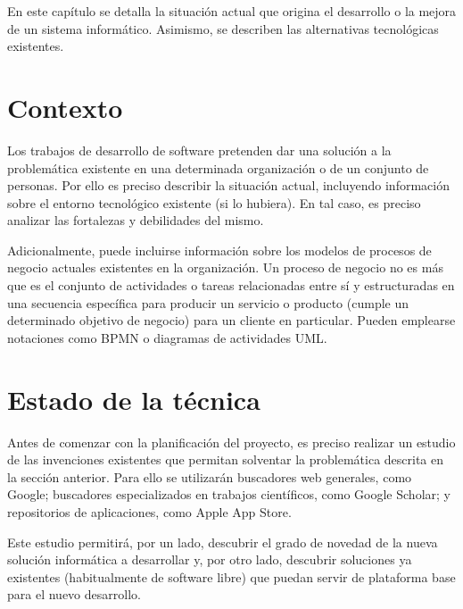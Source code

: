 En este capítulo se detalla la situación actual que origina el desarrollo o la mejora de un sistema informático. Asimismo, se describen las alternativas tecnológicas existentes.

\section{Contexto} 
Los trabajos de desarrollo de software pretenden dar una solución a la problemática existente en una determinada organización o de un conjunto de personas. Por ello es preciso describir la situación actual, incluyendo información sobre el entorno tecnológico existente (si lo hubiera). En tal caso, es preciso analizar las fortalezas y debilidades del mismo.

Adicionalmente, puede incluirse información sobre los modelos de procesos de negocio actuales existentes en la organización. Un proceso de negocio no es más que es el conjunto de actividades o tareas relacionadas entre sí y estructuradas en una secuencia específica para producir un servicio o producto (cumple un determinado objetivo de negocio) para un cliente en particular. Pueden emplearse notaciones como BPMN o diagramas de actividades UML.

\section{Estado de la técnica} 
Antes de comenzar con la planificación del proyecto, es preciso realizar un estudio de las invenciones existentes que permitan solventar la problemática descrita en la sección anterior. Para ello se utilizarán buscadores web generales, como Google; buscadores especializados en trabajos científicos, como Google Scholar; y repositorios de aplicaciones, como Apple App Store.

Este estudio permitirá, por un lado, descubrir el grado de novedad de la nueva solución informática a desarrollar y, por otro lado, descubrir soluciones ya existentes (habitualmente de software libre) que puedan servir de plataforma base para el nuevo desarrollo.





